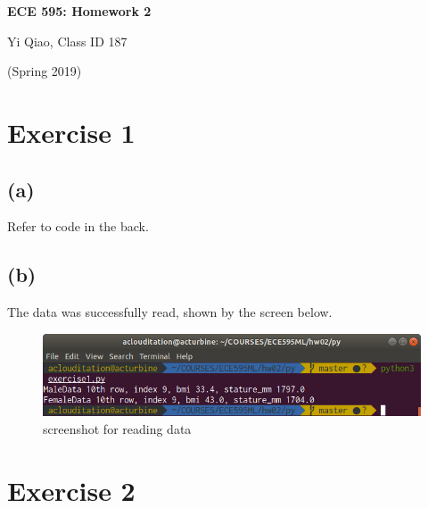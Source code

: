 \documentclass[11pt]{article}
\begin{document}
\begin{center}
\Large{\textbf{ECE 595: Homework 2}}

Yi Qiao, Class ID 187

(Spring 2019)
\end{center}

\section*{Exercise 1}
\subsection*{(a)}
Refer to code in the back. 
\subsection*{(b)}
The data was successfully read, shown by the screen below.
\begin{figure}[h]
	\centering
	\includegraphics[width=0.7\linewidth]{exercise1.png}
	\caption{screenshot for reading data}
\end{figure}

\section*{Exercise 2}
\end{document}
